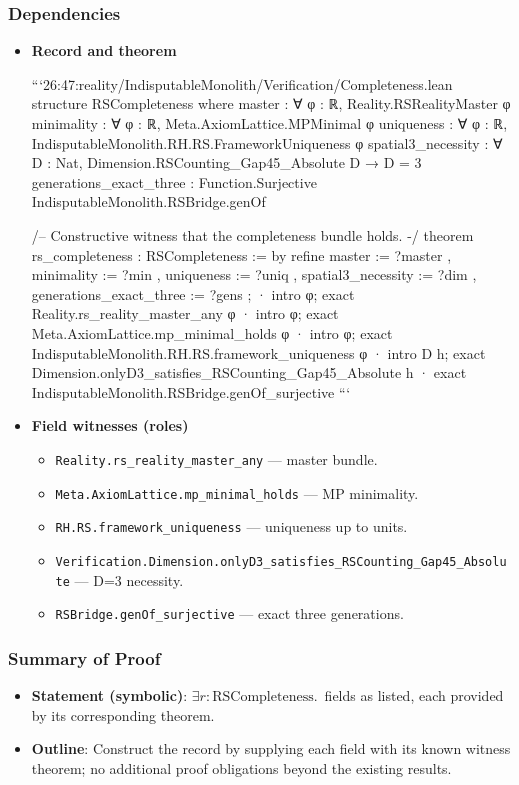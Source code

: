 \documentclass{article}
\begin{document}
\subsubsection{Dependencies}
\begin{itemize}[leftmargin=*]
  \item \textbf{Record and theorem}

```26:47:reality/IndisputableMonolith/Verification/Completeness.lean
structure RSCompleteness where
  master                  : ∀ φ : ℝ, Reality.RSRealityMaster φ
  minimality              : ∀ φ : ℝ, Meta.AxiomLattice.MPMinimal φ
  uniqueness              : ∀ φ : ℝ, IndisputableMonolith.RH.RS.FrameworkUniqueness φ
  spatial3_necessity      : ∀ D : Nat, Dimension.RSCounting_Gap45_Absolute D → D = 3
  generations_exact_three : Function.Surjective IndisputableMonolith.RSBridge.genOf

/-- Constructive witness that the completeness bundle holds. -/
 theorem rs_completeness : RSCompleteness := by
  refine {
    master := ?master
  , minimality := ?min
  , uniqueness := ?uniq
  , spatial3_necessity := ?dim
  , generations_exact_three := ?gens };
  · intro φ; exact Reality.rs_reality_master_any φ
  · intro φ; exact Meta.AxiomLattice.mp_minimal_holds φ
  · intro φ; exact IndisputableMonolith.RH.RS.framework_uniqueness φ
  · intro D h; exact Dimension.onlyD3_satisfies_RSCounting_Gap45_Absolute h
  · exact IndisputableMonolith.RSBridge.genOf_surjective
```

  \item \textbf{Field witnesses (roles)}
  \begin{itemize}
    \item \texttt{Reality.rs\_reality\_master\_any} — master bundle.
    \item \texttt{Meta.AxiomLattice.mp\_minimal\_holds} — MP minimality.
    \item \texttt{RH.RS.framework\_uniqueness} — uniqueness up to units.
    \item \texttt{Verification.Dimension.onlyD3\_satisfies\_RSCounting\_Gap45\_Absolute} — D=3 necessity.
    \item \texttt{RSBridge.genOf\_surjective} — exact three generations.
  \end{itemize}
\end{itemize}

\subsubsection{Summary of Proof}
\begin{itemize}[leftmargin=*]
  \item \textbf{Statement (symbolic)}: \(\exists r: \mathrm{RSCompleteness}.\,\) fields as listed, each provided by its corresponding theorem.
  \item \textbf{Outline}: Construct the record by supplying each field with its known witness theorem; no additional proof obligations beyond the existing results.
\end{itemize}
\end{document}
